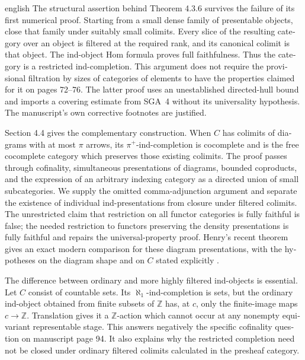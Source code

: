 \begin{otherlanguage}{english}
\begin{otherlanguage*}{english}
The structural assertion behind Theorem 4.3.6 survives the failure of its first numerical proof. Starting from a small dense family of presentable objects, close that family under suitably small colimits. Every slice of the resulting category over an object is filtered at the required rank, and its canonical colimit is that object. The ind-object Hom formula proves full faithfulness. Thus the category is a restricted ind-completion. This argument does not require the provisional filtration by sizes of categories of elements to have the properties claimed for it on pages 72--76. The latter proof uses an unestablished directed-hull bound and imports a covering estimate from SGA~4 without its universality hypothesis. The manuscript's own corrective footnotes are justified.

Section 4.4 gives the complementary construction. When $C$ has colimits of diagrams with at most $\pi$ arrows, its $\pi^+$-ind-completion is cocomplete and is the free cocomplete category which preserves those existing colimits. The proof passes through cofinality, simultaneous presentations of diagrams, bounded coproducts, and the expression of an arbitrary indexing category as a directed union of small subcategories. We supply the omitted comma-adjunction argument and separate the existence of individual ind-presentations from closure under filtered colimits. The unrestricted claim that restriction on all functor categories is fully faithful is false; the needed restriction to functors preserving the density presentations is fully faithful and repairs the universal-property proof. Henry's recent theorem gives an exact modern comparison for these diagram presentations, with the hypotheses on the diagram shape and on $C$ stated explicitly \citep{Henry2025}.

The difference between ordinary and more highly filtered ind-objects is essential. Let $C$ consist of countable sets. Its $\aleph_1$-ind-completion is sets, but the ordinary ind-object obtained from finite subsets of $\mathbb Z$ has, at $c$, only the finite-image maps $c\to\mathbb Z$. Translation gives it a $\mathbb Z$-action which cannot occur at any nonempty equivariant representable stage. This answers negatively the specific cofinality question on manuscript page 94. It also explains why the restricted completion need not be closed under ordinary filtered colimits calculated in the presheaf category.


\end{otherlanguage*}
\end{otherlanguage}
